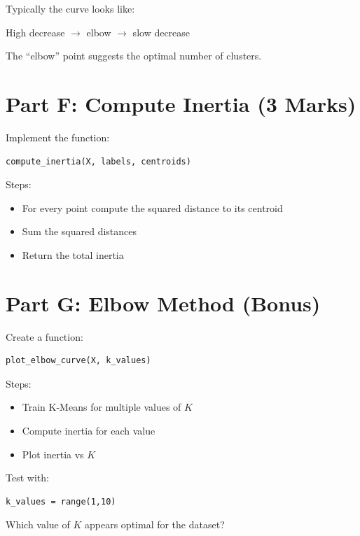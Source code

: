 \documentclass[12pt,a4paper]{article}
\begin{document}
Typically the curve looks like:

\begin{center}
High decrease $\rightarrow$ elbow $\rightarrow$ slow decrease
\end{center}

The ``elbow'' point suggests the optimal number of clusters.


\section{Part F: Compute Inertia (3 Marks)}

\begin{tcolorbox}

Implement the function:

\begin{verbatim}
compute_inertia(X, labels, centroids)
\end{verbatim}

Steps:

\begin{itemize}
\item For every point compute the squared distance to its centroid
\item Sum the squared distances
\item Return the total inertia
\end{itemize}

\end{tcolorbox}


\section{Part G: Elbow Method (Bonus)}

\begin{tcolorbox}

Create a function:

\begin{verbatim}
plot_elbow_curve(X, k_values)
\end{verbatim}

Steps:

\begin{itemize}
\item Train K-Means for multiple values of $K$
\item Compute inertia for each value
\item Plot inertia vs $K$
\end{itemize}

Test with:

\begin{verbatim}
k_values = range(1,10)
\end{verbatim}

Which value of $K$ appears optimal for the dataset?

\end{tcolorbox}
\end{document}
